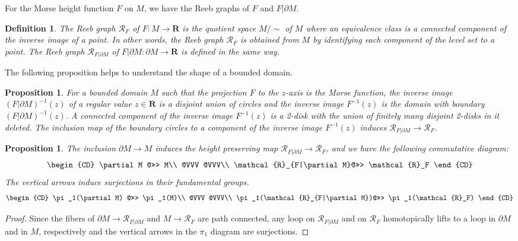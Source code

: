 \documentclass{amsart}
\newtheorem{proposition}[theorem]{Proposition}
\newtheorem{definition}[theorem]{Definition}
\numberwithin{equation}{section}
\newcommand{\RR}{{\boldsymbol{R}}}
\newcommand{\lra}{\longrightarrow}
\newcommand{\bd}{\partial}
\begin{document}
For the Morse height function $F$ on $M$, we have the Reeb graphs of $F$ and $F|\bd M$. 
\begin{definition}
The Reeb graph $\mathcal{R}_F$ of $F:M\lra \RR$ is the quotient space $M/\sim $ of $M$ where an equivalence class is a connected component of the inverse image of a point. In other words, the Reeb graph $\mathcal{R}_{F}$ is obtained from $M$ by identifying each component of the level set to a point.
The Reeb graph $\mathcal{R}_{F|\bd M}$ of $F|\bd M:\bd M\lra \RR$ is defined in the same way.
\end{definition}
The following proposition helps to understand the shape of a bounded domain.
\begin{proposition}
For a bounded domain $M$ such that the projection $F$ to the $z$-axis is the Morse function, the inverse image $(F|\bd M)^{-1}(z)$ of a regular value $z\in \RR$ is a disjoint union of circles and the inverse image $F^{-1}(z)$ is the domain with boundary $(F|\bd M)^{-1}(z)$. A connected component of the inverse image $F^{-1}(z)$ is a 2-disk with the union of finitely many disjoint 2-disks in it deleted. 
The inclusion map of the boundary circles to a component of the inverse image $F^{-1}(z)$ induces $\mathcal{R}_{F|\bd M}\lra \mathcal{R}_{F}$.
\end{proposition}

\begin{proposition}\label{prop:pi1}
The inclusion $\bd M\lra M$ induces the height preserving map $\mathcal{R}_{F|\bd M}\lra \mathcal{R}_{F}$, and we have the following commutative diagram:
$$\begin{CD} \bd M @>>> M\\
@VVV  @VVV\\
\mathcal{R}_{F|\bd M}@>>> \mathcal{R}_F \end{CD} $$ 
The vertical arrows induce surjections in their fundamental groups.
$$\begin{CD} \pi_1(\bd M) @>>> \pi_1(M)\\
@VVV  @VVV\\
\pi_1(\mathcal{R}_{F|\bd M})@>>> \pi_1(\mathcal{R}_F) \end{CD} $$ 
\end{proposition}

\begin{proof}
Since the fibers of $\bd M\lra \mathcal{R}_{F|\bd M}$ and $M\lra  \mathcal{R}_F$ are path connected,  any loop on $\mathcal{R}_{F|\bd M}$ and on $\mathcal{R}_F$ homotopically lifts to a loop in $\bd M$ and in $M$, respectively and 
 the vertical arrows in the $\pi_1$ diagram are surjections.
\end{proof}
\end{document}
